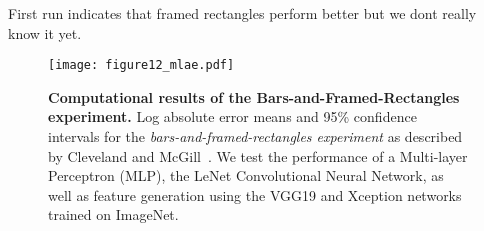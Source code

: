 First run indicates that framed rectangles perform better but we dont really know it yet.

\begin{figure*}[t]
	  \texttt{[image: figure12\_mlae.pdf]}
  \caption{\textbf{Computational results of the Bars-and-Framed-Rectangles experiment.} Log absolute error means and 95\% confidence intervals for the \emph{bars-and-framed-rectangles experiment} as described by Cleveland and McGill~\cite{cleveland_mcgill}. We test the performance of a Multi-layer Perceptron (MLP), the LeNet Convolutional Neural Network, as well as feature generation using the VGG19 and Xception networks trained on ImageNet.}
	\label{fig:figure12_mlae}
\end{figure*}

